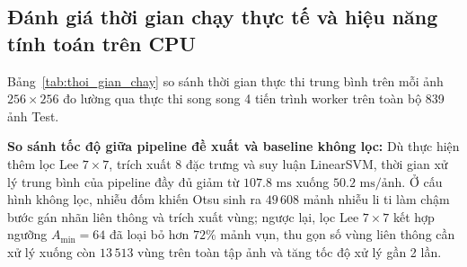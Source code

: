 \subsection{Đánh giá thời gian chạy thực tế và hiệu năng tính toán trên CPU}

Bảng~\ref{tab:thoi_gian_chay} so sánh thời gian thực thi trung bình trên mỗi ảnh $256 \times 256$ đo lường qua thực thi song song 4 tiến trình worker trên toàn bộ 839 ảnh Test.

\begin{table}[!htbp]
\centering
\small
\caption{Thời gian thực thi trung bình và tổng thời gian xử lý 839 ảnh Test trên CPU.}
\label{tab:thoi_gian_chay}
\end{table}

\noindent\textbf{So sánh tốc độ giữa pipeline đề xuất và baseline không lọc:}
Dù thực hiện thêm lọc Lee $7 \times 7$, trích xuất 8 đặc trưng và suy luận LinearSVM, thời gian xử lý trung bình của pipeline đầy đủ giảm từ $107.8\text{ ms}$ xuống $50.2\text{ ms/ảnh}$. Ở cấu hình không lọc, nhiễu đốm khiến Otsu sinh ra $49\,608$ mảnh nhiễu li ti làm chậm bước gán nhãn liên thông và trích xuất vùng; ngược lại, lọc Lee $7 \times 7$ kết hợp ngưỡng $A_{\min} = 64$ đã loại bỏ hơn $72\%$ mảnh vụn, thu gọn số vùng liên thông cần xử lý xuống còn $13\,513$ vùng trên toàn tập ảnh và tăng tốc độ xử lý gần 2 lần.
